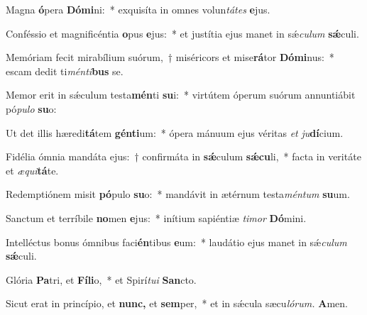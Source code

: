 \item Magna \textbf{ó}pera \textbf{Dó}\textbf{mi}ni:~* exquisíta in omnes volun\textit{tátes} \textbf{e}jus.
\item Conféssio et magnificéntia \textbf{o}pus \textbf{e}jus:~* et justítia ejus manet in sǽ\tinyhspace\textit{culum} \textbf{sǽ}culi.
\item Memóriam fecit mirabílium suórum,~† miséricors et mise\textbf{rá}tor \textbf{Dó}\textbf{mi}nus:~* escam dedit ti\textit{ménti}\textbf{bus} se.
\item Memor erit in sǽculum testa\textbf{mén}ti \textbf{su}i:~* virtútem óperum suórum annuntiábit pó\textit{pulo} \textbf{su}o:
\item Ut det illis hæredi\textbf{tá}tem \textbf{gén}\textbf{ti}um:~* ópera mánuum ejus véritas \textit{et} \textit{ju}\textbf{dí}cium.
\item Fidélia ómnia mandáta ejus:~† confirmáta in \textbf{sǽ}culum \textbf{sǽ}\textbf{cu}li,~* fa\-cta in veritáte et \textit{æqui}\textbf{tá}te.
\item Redemptiónem misit \textbf{pó}pulo \textbf{su}o:~* mandávit in ætérnum testa\textit{méntum} \textbf{su}um.
\item Sanctum et terríbile \textbf{no}men \textbf{e}jus:~* inítium sapiéntiæ \textit{timor} \textbf{Dó}mini.
\item Intelléctus bonus ómnibus faci\textbf{én}tibus \textbf{e}um:~* laudátio ejus manet in sǽ\textit{culum} \textbf{sǽ}culi.
\item Glória \textbf{Pa}tri, et \textbf{Fíli}o,~* et Spirí\tinyhspace\textit{tui} \textbf{San}cto.
\item Sicut erat in princípio, et \textbf{nunc,} et \textbf{sem}per,~* et in sǽcula sæcu\tinyhspace\textit{lórum.} \textbf{A}men.